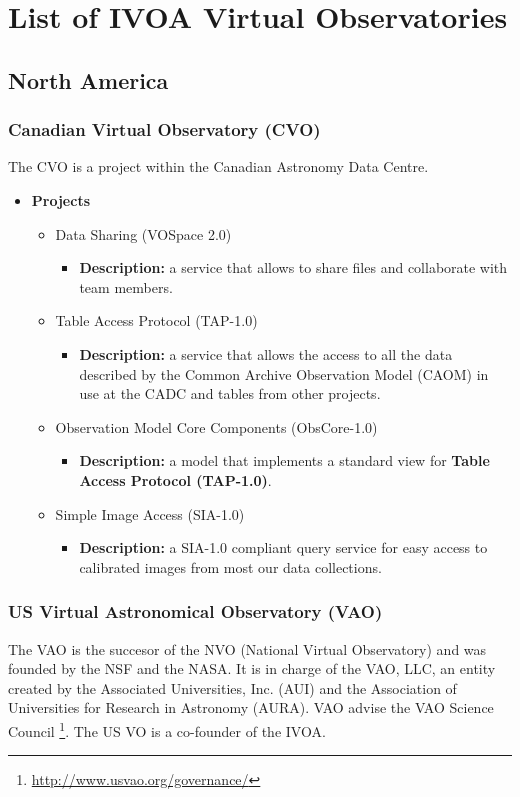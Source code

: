 \section{List of IVOA Virtual Observatories}
\subsection{North America}
\subsubsection{Canadian Virtual Observatory (CVO)}
The CVO \cite{website:cvo-home} \nocite{SchadeDowlerDurand2004} is a project
within the Canadian Astronomy Data Centre.

\begin{itemize}
\item \textbf{Projects}
\begin{itemize}
\item Data Sharing (VOSpace 2.0)
\begin{itemize}
\item \textbf{Description:} a service that allows to share files and collaborate
with team members.
\end{itemize}
\item Table Access Protocol (TAP-1.0)
\begin{itemize}
\item \textbf{Description:} a service that allows the access to all the data
described by the Common Archive Observation Model (CAOM) in use at the CADC and
tables from other projects.
\end{itemize}
\item Observation Model Core Components (ObsCore-1.0)
\begin{itemize}
\item \textbf{Description:} a model that implements a standard view for
\textbf{Table Access Protocol (TAP-1.0)}.
\end{itemize}
\item Simple Image Access (SIA-1.0)
\begin{itemize}
\item \textbf{Description:} a SIA-1.0 compliant query service for easy access to
calibrated images from most our data collections.
\end{itemize}
\end{itemize}
\end{itemize}

\subsubsection{US Virtual Astronomical Observatory (VAO)}
The VAO \cite{website:vao-home} \nocite{DeYoung2010} is the succesor of the NVO
(National Virtual Observatory) and was founded by the NSF and the NASA. It is in
charge of the VAO, LLC, an entity created by the Associated Universities, Inc.
(AUI) and the Association of Universities for Research in Astronomy (AURA). VAO
advise the VAO Science Council
\footnote{\url{http://www.usvao.org/governance/}}. The US VO is a co-founder of
the IVOA.

